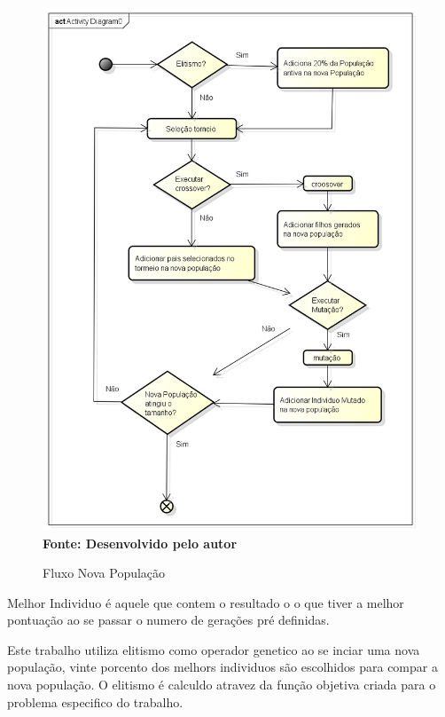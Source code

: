 \documentclass{abntpuc}
\begin{document}
\begin{figure}[!htb]
\caption[Fluxo Nova População]{Fluxo Nova População}
\label{fig:figura8}
\centering
\includegraphics[scale=0.5]{imagens/fluxoNovaPopulacao.png}
\\ \textbf{\footnotesize Fonte: Desenvolvido pelo autor}
\end{figure}

Melhor Individuo é aquele que contem o resultado o o que tiver a melhor pontuação ao se passar o numero de gerações pré definidas.


Este trabalho utiliza elitismo como operador genetico ao se inciar uma nova população, vinte porcento dos melhors individuos são escolhidos para compar a nova população. O elitismo é calculdo atravez da função objetiva criada para o problema especifico do trabalho.\par
\end{document}
